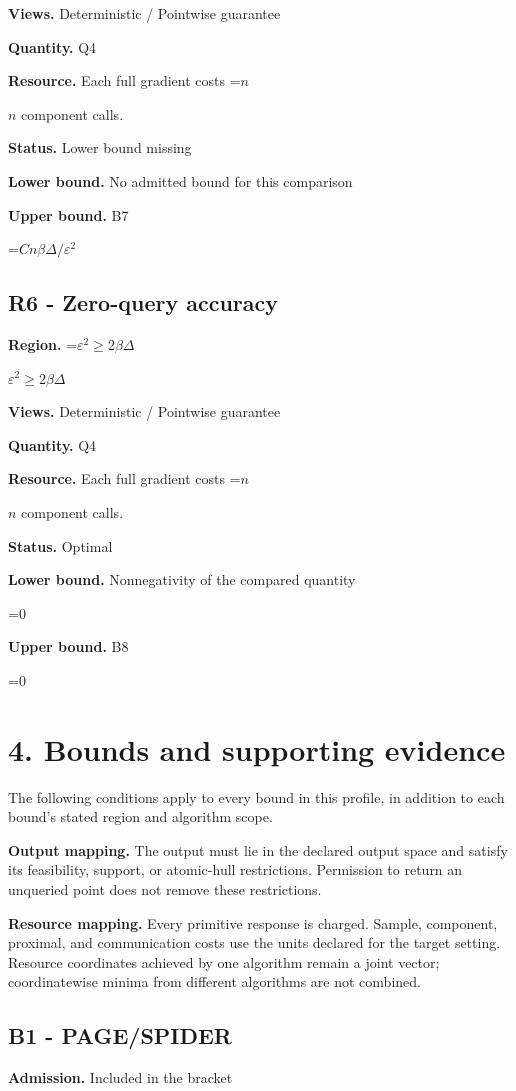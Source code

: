 \documentclass[10pt,a4paper]{article}
\newcommand{\AtlasMath}[1]{\par\begingroup\centering\setbox0=\hbox{$\displaystyle #1$}\ifdim\wd0>1.4\linewidth\typeout{ATLAS WIDE FORMULA: \the\wd0}\fi\ifdim\wd0>\linewidth\resizebox{\linewidth}{!}{\box0}\else\box0\fi\par\endgroup}
\newcommand{\AtlasInlineMath}[1]{\begingroup\setbox0=\hbox{$#1$}\ifdim\wd0>.4\linewidth\endgroup\AtlasMath{#1}\else\endgroup$#1$\fi}
\begin{document}
\textbf{Views.} Deterministic / Pointwise guarantee

\textbf{Quantity.} Q4

\textbf{Resource.} Each full gradient costs \AtlasInlineMath{n} component calls.

\textbf{Status.} Lower bound missing

\textbf{Lower bound.} No admitted bound for this comparison

\textbf{Upper bound.} B7

\AtlasMath{Cn\beta\Delta/\varepsilon^2}
\subsection{R6 - Zero-query accuracy}
\textbf{Region.} \AtlasInlineMath{\varepsilon^2\ge2\beta\Delta}

\textbf{Views.} Deterministic / Pointwise guarantee

\textbf{Quantity.} Q4

\textbf{Resource.} Each full gradient costs \AtlasInlineMath{n} component calls.

\textbf{Status.} Optimal

\textbf{Lower bound.} Nonnegativity of the compared quantity

\AtlasMath{0}
\textbf{Upper bound.} B8

\AtlasMath{0}
\section{4. Bounds and supporting evidence}
The following conditions apply to every bound in this profile, in addition to each bound's stated region and algorithm scope.

\textbf{Output mapping.} The output must lie in the declared output space and satisfy its feasibility, support, or atomic-hull restrictions. Permission to return an unqueried point does not remove these restrictions.

\textbf{Resource mapping.} Every primitive response is charged. Sample, component, proximal, and communication costs use the units declared for the target setting. Resource coordinates achieved by one algorithm remain a joint vector; coordinatewise minima from different algorithms are not combined.

\subsection{B1 - PAGE/SPIDER}
\textbf{Admission.} Included in the bracket
\end{document}
